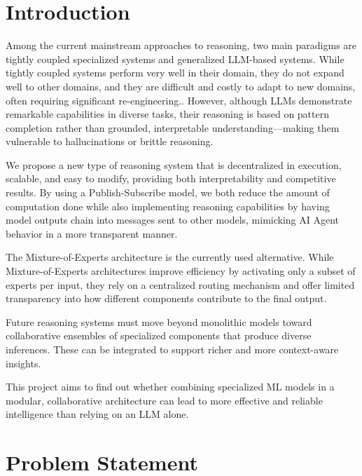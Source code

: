 \documentclass[conference]{IEEEtran}
\begin{document}

\section{Introduction}
Among the current mainstream approaches to reasoning, two main paradigms are tightly coupled specialized systems and generalized LLM-based systems. While tightly coupled systems perform very well in their domain, they do not expand well to other domains, and they are difficult and costly to adapt to new domains, often requiring significant re-engineering.. However, although LLMs demonstrate remarkable capabilities in diverse tasks, their reasoning is based on pattern completion rather than grounded, interpretable understanding—making them vulnerable to hallucinations or brittle reasoning.

We propose a new type of reasoning system that is decentralized in execution, scalable, and easy to modify, providing both interpretability and competitive results. By using a Publish-Subscribe model, we both reduce the amount of computation done while also implementing reasoning capabilities by having model outputs chain into messages sent to other models, mimicking AI Agent behavior in a more transparent manner.

The Mixture-of-Experts architecture is the currently used alternative. While Mixture-of-Experts architectures improve efficiency by activating only a subset of experts per input, they rely on a centralized routing mechanism and offer limited transparency into how different components contribute to the final output.

Future reasoning systems must move beyond monolithic models toward collaborative ensembles of specialized components that produce diverse inferences. These can be integrated to support richer and more context-aware insights.

This project aims to find out whether combining specialized ML models in a modular, collaborative architecture can lead to more effective and reliable intelligence than relying on an LLM alone.



\section{Problem Statement}
\end{document}

